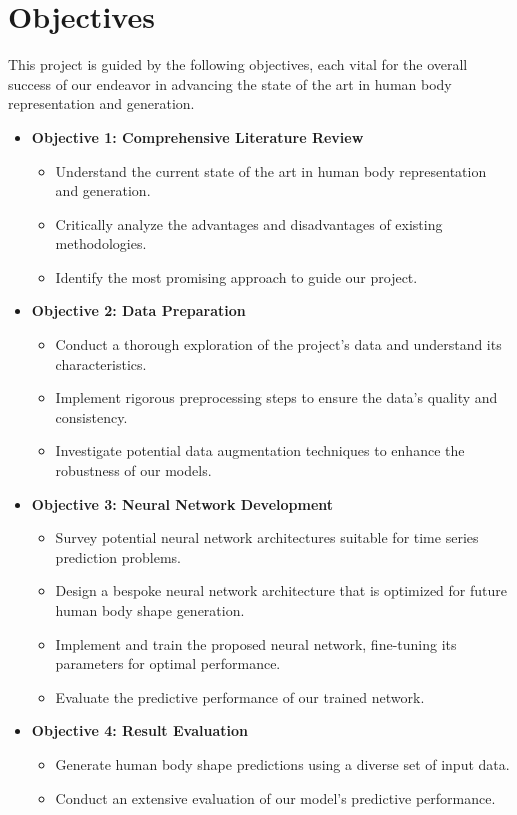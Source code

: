\section{Objectives}\label{objectives}

This project is guided by the following objectives, each vital for the overall
success of our endeavor in advancing the state of the art in human body
representation and generation.

\begin{itemize}
	\item \textbf{Objective 1: Comprehensive Literature Review}
	      \begin{itemize}
		      \item Understand the current state of the art in human body representation and
		            generation.
		      \item Critically analyze the advantages and disadvantages of existing methodologies.
		      \item Identify the most promising approach to guide our project.
	      \end{itemize}

	\item \textbf{Objective 2: Data Preparation}
	      \begin{itemize}
		      \item Conduct a thorough exploration of the project's data and understand its
		            characteristics.
		      \item Implement rigorous preprocessing steps to ensure the data's quality and
		            consistency.
		      \item Investigate potential data augmentation techniques to enhance the robustness of
		            our models.
	      \end{itemize}

	\item \textbf{Objective 3: Neural Network Development}
	      \begin{itemize}
		      \item Survey potential neural network architectures suitable for time series
		            prediction problems.
		      \item Design a bespoke neural network architecture that is optimized for future human
		            body shape generation.
		      \item Implement and train the proposed neural network, fine-tuning its parameters for
		            optimal performance.
		      \item Evaluate the predictive performance of our trained network.
	      \end{itemize}

	\item \textbf{Objective 4: Result Evaluation}
	      \begin{itemize}
		      \item Generate human body shape predictions using a diverse set of input data.
		      \item Conduct an extensive evaluation of our model's predictive performance.
	      \end{itemize}

\end{itemize}
